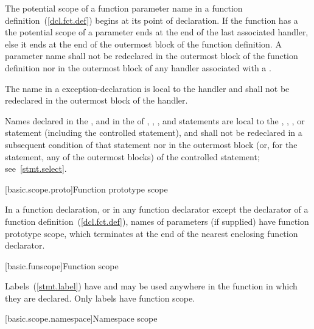 \pnum
{}%
The potential scope of a function parameter name in a function
definition~(\ref{dcl.fct.def}) begins at its point of declaration. If
the function has a  the potential scope of
a parameter ends at the end of the last associated handler, else it ends
at the end of the outermost block of the function definition. A
parameter name shall not be redeclared in the outermost block of the
function definition nor in the outermost block of any handler associated
with a .

\pnum
{}%
The name in a  exception-declaration is local to the
handler and shall not be redeclared in the outermost block of the handler.

\pnum
Names declared in the , and in the
 of , , , and
 statements are local to the , ,
, or  statement (including the controlled
statement), and shall not be redeclared in a subsequent condition of
that statement nor in the outermost block (or, for the 
statement, any of the outermost blocks) of the controlled statement;
see~\ref{stmt.select}.

[basic.scope.proto]{Function prototype scope}

\pnum
{}%
%
In a function declaration, or in any function declarator except the
declarator of a function definition~(\ref{dcl.fct.def}), names of
parameters (if supplied) have function prototype scope, which terminates
at the end of the nearest enclosing function declarator.

[basic.funscope]{Function scope}

\pnum
{}%
%
Labels~(\ref{stmt.label}) have  and
may be used anywhere in the function in which they are declared. Only
labels have function scope.

[basic.scope.namespace]{Namespace scope}

